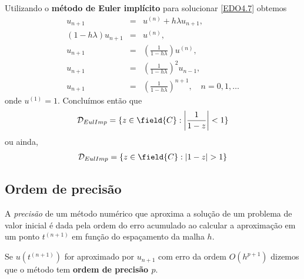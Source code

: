 \begin{ex}
Utilizando o \textbf{método de Euler implícito} para solucionar \eqref{EDO4.7} obtemos
\begin{eqnarray}
 u_{n+1}      &=& u^{(n)}+h\lambda u_{n+1}, \\
 (1-h\lambda )u_{n+1} & =& u^{(n)}, \\
       u_{n+1} & =& \left(\frac{1}{1- h\lambda }\right)u^{(n)}, \\
       u_{n+1} & =& \left(\frac{1}{1- h\lambda }\right)^2u_{n-1}, \\
       u_{n+1} & =& \left(\frac{1}{1- h\lambda }\right)^{n+1}, \quad  n=0,1,\ldots
\end{eqnarray}
onde $u^{(1)}=1$.
Concluímos então que
\begin{eqnarray}
 \mathcal D_{EulImp} = \{z \in  \field{C}:  \left|\frac{1}{1- z}\right|<1\}
\end{eqnarray}
ou ainda,
\begin{eqnarray}
 \mathcal D_{EulImp} = \{z \in  \field{C}:  |1- z|>1\}
\end{eqnarray}


\end{ex}




































\subsection{Ordem de precisão}




A \emph{precisão} de um método numérico que aproxima a solução de um problema de valor inicial é dada pela ordem do erro acumulado ao calcular a aproximação em um ponto $t^{(n+1)}$ em função do espaçamento da malha $h$.

Se $u(t^{(n+1)})$ for aproximado por $u_{n+1}$ com erro da ordem $O(h^{p+1})$ dizemos que o método tem \textbf{ordem de precisão $p$}.


